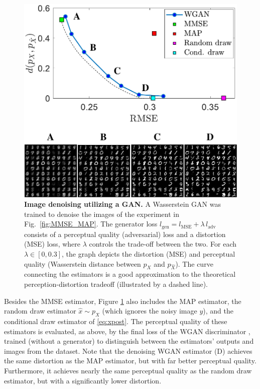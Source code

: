 \begin{figure}
	\begin{center}
		\includegraphics[width=\linewidth]{figures/WGAN.pdf}
	\end{center}
	\caption{\textbf{Image denoising utilizing a GAN.} A Wasserstein GAN was trained to denoise the images of the experiment in Fig.~\ref{fig:MMSE_MAP}. The generator loss $l_\text{gen} = l_{\text{MSE}} + \lambda \, l_{\text{adv}}$ consists of a perceptual quality (adversarial) loss and a distortion (MSE) loss, where $\lambda$ controls the trade-off between the two. For each $\lambda \in [0,0.3]$, the graph depicts the distortion (MSE) and perceptual quality (Wasserstein distance between $p_X$ and $p_{\hat{X}}$). The curve connecting the estimators is a good approximation to the theoretical perception-distortion tradeoff (illustrated by a dashed line).}
	\label{fig:WGAN}
\end{figure}

Besides the MMSE estimator, Figure \ref{fig:WGAN} also includes the MAP estimator, the random draw estimator $\hat{x}\sim p_X$ (which ignores the noisy image $y$), and the conditional draw estimator of \eqref{eq:xpost}. The perceptual quality of these estimators is evaluated, as above, by the final loss of the WGAN discriminator \cite{arjovsky2017wasserstein}, trained (without a generator) to distinguish between the estimators' outputs and images from the dataset.
Note that the denoising WGAN estimator (D) achieves the same distortion as the MAP estimator, but with far better perceptual quality. Furthermore, it achieves nearly the same perceptual quality as the random draw estimator, but with a significantly lower distortion.
